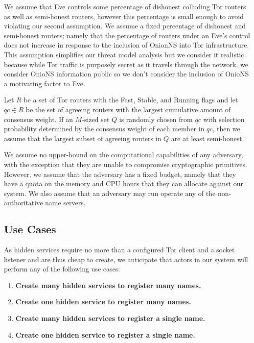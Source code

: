 \documentclass[USenglish,oneside,twocolumn]{article}
\begin{document}
We assume that Eve controls some percentage of dishonest colluding Tor routers as well as semi-honest routers, however this percentage is small enough to avoid violating our second assumption. We assume a fixed percentage of dishonest and semi-honest routers; namely that the percentage of routers under an Eve's control does not increase in response to the inclusion of OnionNS into Tor infrastructure. This assumption simplifies our threat model analysis but we consider it realistic because while Tor traffic is purposely secret as it travels through the network, we consider OnioNS information public so we don't consider the inclusion of OnioNS a motivating factor to Eve.

Let $ R $ be a set of Tor routers with the Fast, Stable, and Running flags and let $ \mathit{qc} \in R $ be the set of agreeing routers with the largest cumulative amount of consensus weight. If an $ M $-sized set $ Q $ is randomly chosen from $ \mathit{qc} $ with selection probability determined by the consensus weight of each member in $ \mathit{qc} $, then we assume that the largest subset of agreeing routers in $ Q $ are at least semi-honest.

We assume no upper-bound on the computational capabilities of any adversary, with the exception that they are unable to compromise cryptographic primitives. However, we assume that the adversary has a fixed budget, namely that they have a quota on the memory and CPU hours that they can allocate against our system. We also assume that an adversary may run operate any of the non-authoritative name servers.


\subsection{Use Cases}
\label{sec:useCases}

As hidden services require no more than a configured Tor client and a socket listener and are thus cheap to create, we anticipate that actors in our system will perform any of the following use cases:

\begin{enumerate}
	\item \textbf{Create many hidden services to register many names.}
	\item \textbf{Create one hidden service to register many names.}
	\item \textbf{Create many hidden services to register a single name.}
	\item \textbf{Create one hidden service to register a single name.}
\end{enumerate}
\end{document}
